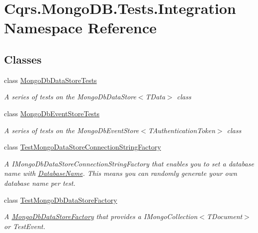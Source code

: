 \hypertarget{namespaceCqrs_1_1MongoDB_1_1Tests_1_1Integration}{}\section{Cqrs.\+Mongo\+D\+B.\+Tests.\+Integration Namespace Reference}
\label{namespaceCqrs_1_1MongoDB_1_1Tests_1_1Integration}
\subsection*{Classes}
\begin{DoxyCompactItemize}
\item 
class \hyperlink{classCqrs_1_1MongoDB_1_1Tests_1_1Integration_1_1MongoDbDataStoreTests}{Mongo\+Db\+Data\+Store\+Tests}
\begin{DoxyCompactList}\small\item\em A series of tests on the Mongo\+Db\+Data\+Store$<$\+T\+Data$>$ class \end{DoxyCompactList}\item 
class \hyperlink{classCqrs_1_1MongoDB_1_1Tests_1_1Integration_1_1MongoDbEventStoreTests}{Mongo\+Db\+Event\+Store\+Tests}
\begin{DoxyCompactList}\small\item\em A series of tests on the Mongo\+Db\+Event\+Store$<$\+T\+Authentication\+Token$>$ class \end{DoxyCompactList}\item 
class \hyperlink{classCqrs_1_1MongoDB_1_1Tests_1_1Integration_1_1TestMongoDataStoreConnectionStringFactory}{Test\+Mongo\+Data\+Store\+Connection\+String\+Factory}
\begin{DoxyCompactList}\small\item\em A I\+Mongo\+Db\+Data\+Store\+Connection\+String\+Factory that enables you to set a database name with \hyperlink{classCqrs_1_1MongoDB_1_1Tests_1_1Integration_1_1TestMongoDataStoreConnectionStringFactory_a2d26a00fd14aad6718b48d515ac30ff9_a2d26a00fd14aad6718b48d515ac30ff9}{Database\+Name}. This means you can randomly generate your own database name per test. \end{DoxyCompactList}\item 
class \hyperlink{classCqrs_1_1MongoDB_1_1Tests_1_1Integration_1_1TestMongoDbDataStoreFactory}{Test\+Mongo\+Db\+Data\+Store\+Factory}
\begin{DoxyCompactList}\small\item\em A \hyperlink{classCqrs_1_1MongoDB_1_1Factories_1_1MongoDbDataStoreFactory_a5306704647ba6dab35844231ca999b7e_a5306704647ba6dab35844231ca999b7e}{Mongo\+Db\+Data\+Store\+Factory} that provides a I\+Mongo\+Collection$<$\+T\+Document$>$ or Test\+Event. \end{DoxyCompactList}\item 

\end{DoxyCompactItemize}
